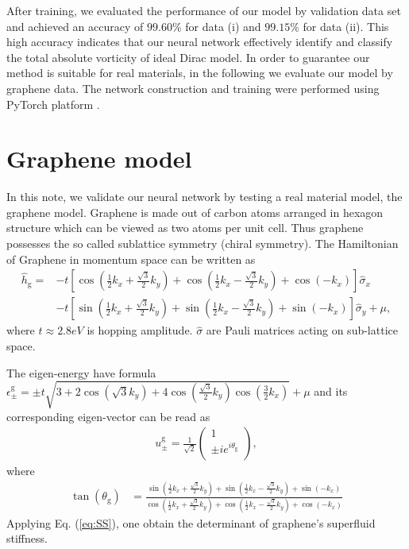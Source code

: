 \documentclass{article}
\begin{document}
After training, we evaluated the performance of our model by validation data set and achieved an accuracy of $ 99.60\% $ for data (i) and $ 99.15 \% $ for data (ii). This high accuracy indicates that our neural network effectively identify and classify the total absolute vorticity of ideal Dirac model. In order to guarantee our method is suitable for real materials, in the following we evaluate our model by graphene data. The network construction and training were performed using  PyTorch platform\cite{paszke2019pytorch} .


\section{Graphene model}
In this note, we validate our neural network by testing a real material model, the graphene model. Graphene is made out of carbon atoms arranged in hexagon structure which can be viewed as two atoms per unit cell. Thus graphene possesses the so called sublattice symmetry (chiral symmetry). The Hamiltonian of Graphene in momentum space can be written as 
\begin{align}
    \hat{h}_{\textrm{g}} = &-t \left[\cos(\frac{1}{2}k_x + \frac{\sqrt{3}}{2} k_y )+ \cos(\frac{1}{2}k_x - \frac{\sqrt{3}}{2} k_{y}  )+ \cos(-k_x)\right] \hat{\sigma}_x \nonumber\\
    &-t \left[\sin(\frac{1}{2}k_x + \frac{\sqrt{3}}{2} k_y )+ \sin(\frac{1}{2}k_x - \frac{\sqrt{3}}{2} k_y )+ \sin(-k_x)\right] \hat{\sigma}_y+\mu,
\end{align}
where $ t \approx 2.8eV $ is hopping amplitude. $ \hat{\sigma} $ are Pauli matrices acting on sub-lattice space.

The eigen-energy have formula $ \epsilon^{\textrm{g}}_\pm = \pm t \sqrt{3+2 \cos(\sqrt{3} k_y )+4 \cos(\frac{\sqrt{3}}{2}k_y ) \cos(\frac{3}{2}k_x)} + \mu  $ and its corresponding eigen-vector can be read as 
\begin{align}
    u^{\textrm{g}}_\pm = \frac{1}{\sqrt{2} } \left(\begin{array}{c}
         1 \\
         \pm i e^{i \theta_{\textrm{g}} } \\
    \end{array}\right),
\end{align}
where
\begin{align}
    \tan(\theta_{\textrm{g}} ) &= \frac{\sin(\frac{1}{2}k_x + \frac{\sqrt{3}}{2} k_y )+ \sin(\frac{1}{2}k_x - \frac{\sqrt{3}}{2} k_y )+ \sin(-k_x)}{\cos(\frac{1}{2}k_x + \frac{\sqrt{3}}{2} k_y )+ \cos(\frac{1}{2}k_x - \frac{\sqrt{3}}{2} k_{y}  )+ \cos(-k_x)} 
\end{align}
Applying Eq. (\ref{eq:SS}), one obtain the determinant of graphene's superfluid stiffness. 
\end{document}
